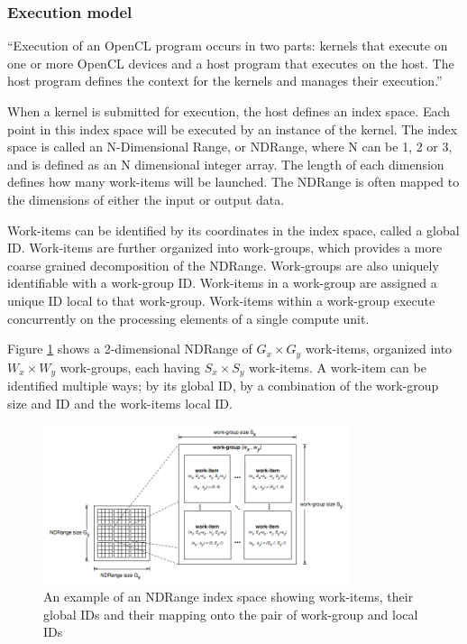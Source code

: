 \subsubsection{Execution model}

``Execution of an OpenCL program occurs in two parts: kernels that execute on
one or more OpenCL devices and a host program that executes on the host. The
host program defines the context for the kernels and manages their
execution.'' \cite{cl-spec}

When a kernel is submitted for execution, the host defines an index space.
Each point in this index space will be executed by an instance of the kernel.
The index space is called an N-Dimensional Range, or NDRange, where N can be
1, 2 or 3, and is defined as an N dimensional integer array. The length of
each dimension defines how many work-items will be launched. The NDRange is
often mapped to the dimensions of either the input or output data.

Work-items can be identified by its coordinates in the index space, called a
global ID. Work-items are further organized into work-groups, which provides a
more coarse grained decomposition of the NDRange. Work-groups are also
uniquely identifiable with a work-group ID. Work-items in a work-group are
assigned a unique ID local to that work-group. Work-items within a work-group
execute concurrently on the processing elements of a single compute unit.

Figure \ref{execution-model-figure} shows a 2-dimensional NDRange of $G_x
\times G_y$ work-items, organized into $W_x \times W_y$ work-groups, each
having $S_x \times S_y$ work-items. A work-item can be identified multiple
ways; by its global ID, by a combination of the work-group size and ID and the
work-items local ID.

\begin{figure}[h]
  \centering
  \includegraphics[width=0.8\textwidth]{images/execution-model.png}
  \caption{An example of an NDRange index space showing work-items,
    their global IDs and their mapping onto the pair of work-group and
    local IDs}
  \label{execution-model-figure}
\end{figure}


